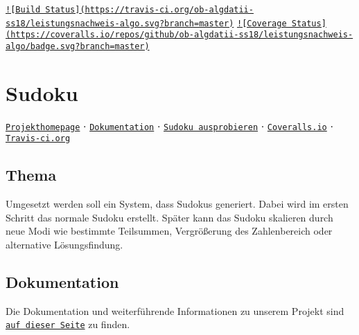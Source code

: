 \href{https://travis-ci.org/ob-algdatii-ss18/leistungsnachweis-algo}{\tt !\mbox{[}Build Status\mbox{]}(https\-://travis-\/ci.\-org/ob-\/algdatii-\/ss18/leistungsnachweis-\/algo.\-svg?branch=master)} \href{https://coveralls.io/github/ob-algdatii-ss18/leistungsnachweis-algo?branch=master}{\tt !\mbox{[}Coverage Status\mbox{]}(https\-://coveralls.\-io/repos/github/ob-\/algdatii-\/ss18/leistungsnachweis-\/algo/badge.\-svg?branch=master)}

\section*{Sudoku}

\href{https://ob-algdatii-ss18.github.io/leistungsnachweis-algo/}{\tt Projekthomepage} ⋅ \href{https://ob-algdatii-ss18.github.io/leistungsnachweis-algo/doxygen_doc/html/index.html}{\tt Dokumentation} ⋅ \href{https://ob-algdatii-ss18.github.io/leistungsnachweis-algo/}{\tt Sudoku ausprobieren} ⋅ \href{https://coveralls.io/repos/github/ob-algdatii-ss18/leistungsnachweis-algo/}{\tt Coveralls.\-io} ⋅ \href{https://travis-ci.org/ob-algdatii-ss18/leistungsnachweis-algo}{\tt Travis-\/ci.\-org} \subsection*{Thema}

Umgesetzt werden soll ein System, dass Sudokus generiert. Dabei wird im ersten Schritt das normale Sudoku erstellt. Später kann das Sudoku skalieren durch neue Modi wie bestimmte Teilsummen, Vergrößerung des Zahlenbereich oder alternative Lösungsfindung. \subsection*{Dokumentation}

Die Dokumentation und weiterführende Informationen zu unserem Projekt sind \href{https://ob-algdatii-ss18.github.io/leistungsnachweis-algo/}{\tt auf dieser Seite} zu finden. 
